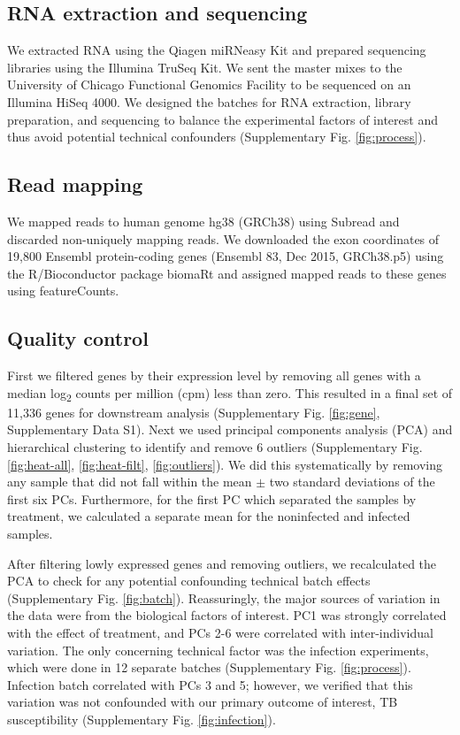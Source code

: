 \documentclass[fleqn,10pt]{wlscirep}
\begin{document}
\subsection*{RNA extraction and sequencing}

We extracted RNA using the Qiagen miRNeasy Kit and prepared sequencing
libraries using the Illumina TruSeq Kit. We sent the master mixes to
the University of Chicago Functional Genomics Facility to be sequenced
on an Illumina HiSeq 4000. We designed the batches for RNA extraction,
library preparation, and sequencing to balance the experimental
factors of interest and thus avoid potential technical confounders
(Supplementary Fig. \ref{fig:process}).
\subsection*{Read mapping}

We mapped reads to human genome hg38 (GRCh38) using Subread and
discarded non-uniquely mapping reads. We downloaded the exon
coordinates of 19,800 Ensembl protein-coding genes (Ensembl 83, Dec
2015, GRCh38.p5) using the R/Bioconductor package biomaRt and assigned
mapped reads to these genes using featureCounts.
\subsection*{Quality control}

First we filtered genes by their expression level by removing all
genes with a median log\textsubscript{2} counts per million (cpm) less
than zero. This resulted in a final set of 11,336 genes for downstream
analysis (Supplementary Fig. \ref{fig:gene}, Supplementary Data S1).
Next we used principal components analysis (PCA) and hierarchical
clustering to identify and remove 6 outliers (Supplementary Fig.
\ref{fig:heat-all}, \ref{fig:heat-filt}, \ref{fig:outliers}). We did
this systematically by removing any sample that did not fall within
the mean $\pm$ two standard deviations of the first six PCs.
Furthermore, for the first PC which separated the samples by
treatment, we calculated a separate mean for the noninfected and
infected samples.

After filtering lowly expressed genes and removing outliers, we
recalculated the PCA to check for any potential confounding technical
batch effects (Supplementary Fig. \ref{fig:batch}). Reassuringly, the
major sources of variation in the data were from the biological
factors of interest. PC1 was strongly correlated with the effect of
treatment, and PCs 2-6 were correlated with inter-individual
variation. The only concerning technical factor was the infection
experiments, which were done in 12 separate batches (Supplementary
Fig. \ref{fig:process}). Infection batch correlated with PCs 3 and 5;
however, we verified that this variation was not confounded with our
primary outcome of interest, TB susceptibility (Supplementary Fig.
\ref{fig:infection}).
\end{document}
